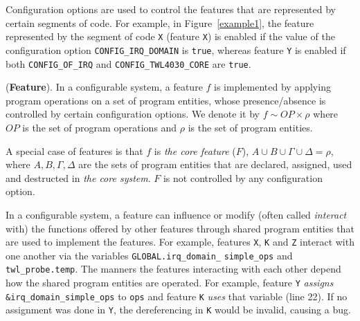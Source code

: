 Configuration options are used to control the features that are
represented by certain segments of code. For example, in
Figure~\ref{example1}, the feature represented by the segment of code
\texttt{X} (feature \texttt{X}) is enabled if the value of
the configuration option \texttt{CONFIG\_IRQ\_DOMAIN} is \texttt{true},
whereas feature \texttt{Y} is enabled if both \texttt{CONFIG\_OF\_IRQ} and \texttt{CONFIG\_\-TWL4030\_CORE} are \texttt{true}.

\begin{Definition}{({\bf Feature}).}
In a configurable system, a feature $f$ is implemented by applying
program operations on a set of program entities, whose
presence/absence is controlled by certain configuration options.
%
%
We denote it by $f \sim OP \times \rho$ where $OP$ is the set of
program operations and $\rho$ is the set of program entities.
\end{Definition}

A special case of features is that $f$ is \textit{the core feature}
($F$), $A \cup B \cup \Gamma \cup \Delta=\rho$, where $A, B, \Gamma,
\Delta$ are the sets of program entities that are declared, assigned,
used and destructed in \textit{the core system}. $F$ is not controlled
by any configuration option.





In a configurable system, a feature can influence or modify (often
called \textit{interact} with) the functions offered by other
features through shared program entities that are used to implement
the features. For example, features \texttt{X}, \texttt{K} and \texttt{Z} 
interact with one another via the variables \texttt{GLOBAL.irq\_domain\_} \texttt{simple\_ops} and \texttt{twl\_probe.temp}.
%
The manners the features interacting with each other depend how the
shared program entities are operated. For example, feature \texttt{Y}
\textit{assigns} \texttt{\&irq\_domain\_simple\_ops} to \texttt{ops}
and feature \texttt{K} \textit{uses} that variable (line 22). If no
assignment was done in \texttt{Y}, the dereferencing in \texttt{K}
would be invalid, causing a bug.

